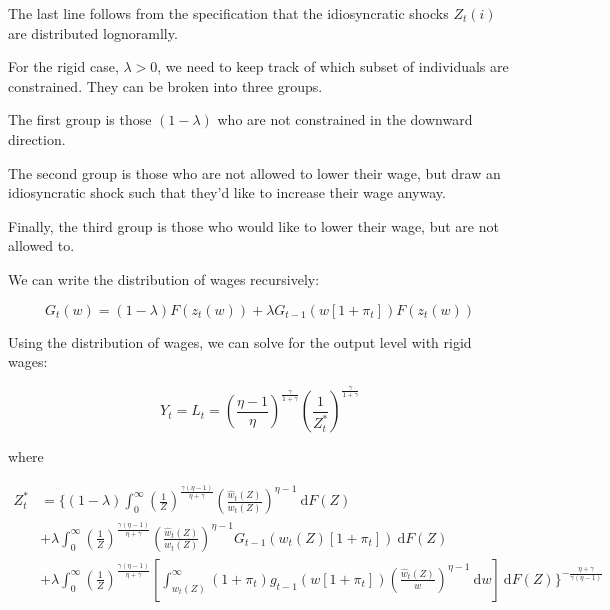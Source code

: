 \documentclass[12pt,a4paper]{scrartcl}            %
\begin{document}
The last line follows from the specification that the idiosyncratic shocks $Z_t(i)$ are distributed lognoramlly.

For the rigid case, $\lambda > 0$, we need to keep track of which subset of individuals are constrained.
They can be broken into three groups.

The first group is those $(1 - \lambda)$ who are not constrained in the downward direction.

The second group is those who are not allowed to lower their wage, but draw an idiosyncratic shock such that they'd like to increase their wage anyway.

Finally, the third group is those who would like to lower their wage, but are not allowed to.

We can write the distribution of wages recursively:

\begin{equation}
    \label{eq:wage_distribution}
    G_t(w) = (1 - \lambda) F(z_t(w)) + \lambda G_{t-1}\left(w[1 + \pi_t]\right)F(z_t(w))
\end{equation}

Using the distribution of wages, we can solve for the output level with rigid wages:

\begin{equation}
    \label{eq:output_rigid}
    Y_t = L_t = \left(\frac{\eta - 1}{\eta} \right)^{\frac{\gamma}{1 + \gamma}}\left( \frac{1}{Z_t^*} \right)^{\frac{\gamma}{1 + \gamma}}
\end{equation}

where

\begin{equation}
    \label{eq:z_star}
    \begin{split}
    Z_t^* &= \Big\{(1 - \lambda) \int_{0}^{\infty} \! \left( \frac{1}{Z} \right)^{\frac{\gamma(\eta - 1)}{\eta + \gamma}} \left( \frac{\hat{w}_t(Z)}{w_t(Z)} \right)^{\eta - 1}\ \mathrm{d}F(Z) \\
          &+            \lambda  \int_{0}^{\infty} \! \left( \frac{1}{Z} \right)^{\frac{\gamma(\eta - 1)}{\eta + \gamma}} \left( \frac{\hat{w}_t(Z)}{w_t(Z)} \right)^{\eta - 1} G_{t-1}\left( w_t(Z)[1 + \pi_t] \right)                                                     \ \mathrm{d}F(Z)\\
          &+            \lambda  \int_{0}^{\infty} \! \left( \frac{1}{Z} \right)^{\frac{\gamma(\eta - 1)}{\eta + \gamma}} \left[ \int_{w_t(Z)}^{\infty} (1 + \pi_t)g_{t-1}\left( w[1 + \pi_t] \right) \left( \frac{\hat{w}_t(Z)}{w} \right)^{\eta - 1}\ \mathrm{d}w \right] \ \mathrm{d}F(Z)
            \Big\}^{-\frac{\eta + \gamma}{\gamma(\eta - 1)}}
    \end{split}
\end{equation}
\end{document}
